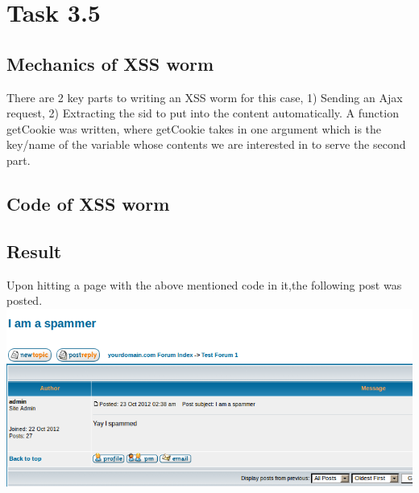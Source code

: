 \documentclass[12pt]{article}
\begin{document}
\section{Task 3.5}
\subsection{Mechanics of XSS worm}
There are 2 key parts to writing an XSS worm for this case, 1) Sending an Ajax request, 2) Extracting the sid to put into the content automatically. A function getCookie was written, where getCookie takes in one argument which is the key/name of the variable whose contents we are interested in to serve the second part.

\subsection{Code of XSS worm}
\lstset{caption=XSS Worm, frame=single}


\subsection{Result}
Upon hitting a page with the above mentioned code in it,the following post was posted.\\
\includegraphics[width=160mm]{task35.png}
\enddocument
\end{document}

